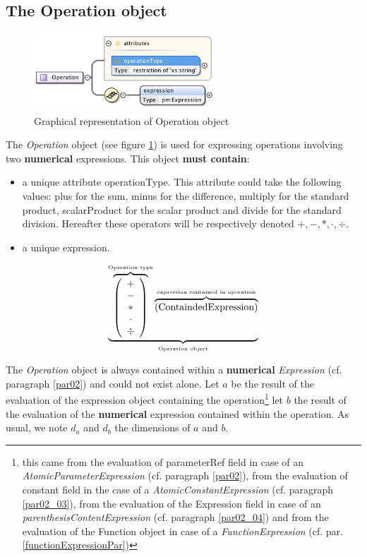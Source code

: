 \documentclass[a4paper,11pt] {ivoa}
\begin{document}
\subsection{The Operation object}\label{par02_02}
\begin{figure}[htbp]
\begin{center}
\includegraphics[width=0.6\textwidth]{pictures/Operation.jpg} 
\caption{Graphical representation of Operation object}
\label{Pic-Operation}
\end{center}
\end{figure}

The {\it Operation} object (see figure \ref{Pic-Operation}) is used for expressing operations
involving two {\bf numerical} expressions. This object {\bf must contain}:
\begin{itemize}
\item a unique attribute operationType. This attribute could take the following values: plus for the
sum, minus for the difference, multiply for the standard product, scalarProduct for the scalar
product and divide for the standard division. Hereafter these operators will be respectively denoted
$+,-,\ast,\cdot, \div$.
\item a unique expression.
\end{itemize}
\begin{equation}\label{OperationEquation}
\underbrace{ \overbrace{\left( \begin{array}{c} + \\ - \\ \ast  \\ \cdot \\ \div   \end{array} \right) }^{\mbox{\tiny Operation type}}
 \overbrace{    \left( \mbox{ContaindedExpression}\right) }^{\mbox{\tiny expression contained in operation}}   }_{\mbox{\tiny Operation object}}
\end{equation}

The {\it Operation} object is always contained within a {\bf numerical} {\it Expression} (cf.
paragraph \ref{par02}) and could not exist alone.
Let $a$ be the result of the evaluation of the expression object containing the
operation\footnote{this came from the evaluation of parameterRef field in case of an {\it
AtomicParameterExpression}  (cf. paragraph \ref{par02}), from the evaluation of constant field in the
case of a {\it AtomicConstantExpression} (cf. paragraph \ref{par02_03}), from the evaluation of the Expression field in case of an  {\it parenthesisContentExpression}  (cf. paragraph \ref{par02_04}) and from the evaluation of the Function object in case of a {\it FunctionExpression} (cf. par. \ref{functionExpressionPar}) }  let $b$ the
result of the evaluation of the {\bf numerical} expression contained within the operation. As usual,
we note $d_a$ and $d_b$ the dimensions of $a$ and $b$.\\
\end{document}
